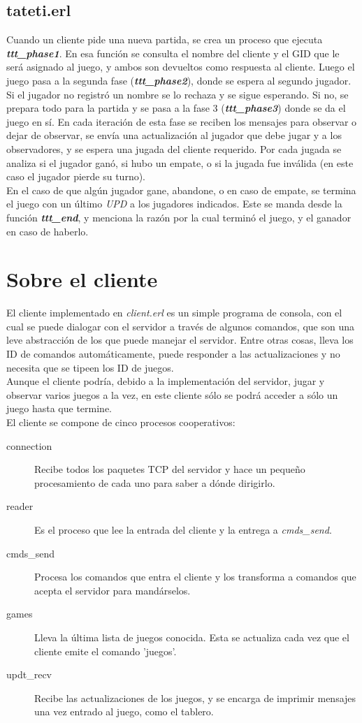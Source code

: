 \documentclass[a4paper]{report}
\newcommand{\femph}[1]{\textbf{\textit{#1}}}
\begin{document}
\subsection*{tateti.erl}
Cuando un cliente pide una nueva partida, se crea un proceso que ejecuta
\femph{ttt\_phase1}. En esa funci\'on se consulta el nombre del cliente
y el GID que le ser\'a asignado al juego, y ambos son devueltos como
respuesta al cliente. Luego el juego pasa a la segunda fase
(\femph{ttt\_phase2}), donde se espera al segundo jugador. Si el jugador
no registr\'o un nombre se lo rechaza y se sigue esperando. Si no, se
prepara todo para la partida y se pasa a la fase 3 (\femph{ttt\_phase3})
donde se da el juego en s\'i. En cada iteraci\'on de esta fase se reciben
los mensajes para observar o dejar de observar, se env\'ia una actualizaci\'on
al jugador que debe jugar y a los observadores, y se espera una jugada del
cliente requerido. Por cada jugada se analiza si el jugador gan\'o, si hubo
un empate, o si la jugada fue inv\'alida (en este caso el jugador pierde su
turno). \\
En el caso de que alg\'un jugador gane, abandone, o en caso de empate, se
termina el juego con un \'ultimo \textit{UPD} a los jugadores indicados.
Este se manda desde la funci\'on \femph{ttt\_end}, y menciona la raz\'on
por la cual termin\'o el juego, y el ganador en caso de haberlo.

\section*{Sobre el cliente}
El cliente implementado en \textit{client.erl} es un simple programa de
consola, con el cual se puede dialogar con el servidor a través de algunos
comandos, que son una leve abstracción de los que puede manejar el servidor.
Entre otras cosas, lleva los ID de comandos automáticamente, puede responder
a las actualizaciones y no necesita que se tipeen los ID de juegos. \\
Aunque el cliente podría, debido a la implementación del servidor, jugar y
observar varios juegos a la vez, en este cliente sólo se podrá acceder a 
sólo un juego hasta que termine. \\
El cliente se compone de cinco procesos cooperativos:
\begin{description}
	\item[connection] Recibe todos los paquetes TCP del servidor y hace un
	pequeño procesamiento de cada uno para saber a dónde dirigirlo.
	\item[reader] Es el proceso que lee la entrada del cliente y la entrega
	a \textit{cmds\_send}.
	\item[cmds\_send] Procesa los comandos que entra el cliente y los 
	transforma a comandos que acepta el servidor para mandárselos.
	\item[games] Lleva la última lista de juegos conocida. Esta se actualiza
	cada vez que el cliente emite el comando 'juegos'.
	\item[updt\_recv] Recibe las actualizaciones de los juegos, y se encarga
	de imprimir mensajes una vez entrado al juego, como el tablero.
\end{description}
\end{document}
